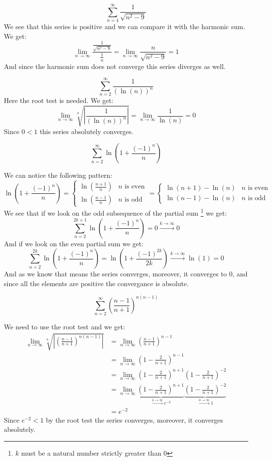 \documentclass[11pt,a4paper]{article}
\begin{document}
	\newpage
	
	\[
		\sum_{n=4}^{\infty}{\frac{1}{\sqrt{n^2-9}}}
	\]
	We see that this series is positive and we can compare it with the 
	harmonic sum. We get:
	\[
	\lim_{n\to\infty}{\frac{\frac{1}{\sqrt{n^2-9}}}{\frac{1}{n}}} = 
	\lim_{n\to\infty}{\frac{n}{\sqrt{n^2-9}}} = 1
	\]
	And since the harmonic sum does not converge this series diverges as well.
	
	\newpage
	
	\[
		\sum_{n=2}^{\infty}{\frac{1}{(\ln(n))^n}}
	\]
	Here the root test is needed. We get:
	\[
	\lim_{n\to\infty}{\sqrt[n]{\left\vert\frac{1}{(\ln(n))^n}\right\vert}} = 
	\lim_{n\to\infty}{\frac{1}{\ln(n)}} = 0
	\]
	Since $0 < 1$ this series absolutely converges.
	
	\newpage
	
	\[
		\sum_{n=2}^{\infty}{\ln\left(1+\frac{(-1)^n}{n}\right)}
	\]
	
	We can notice the following pattern:
	\[
	\ln\left(1+\frac{(-1)^n}{n}\right) = \begin{cases}
		 \ln\left(\frac{n+1}{n}\right) & \text{$n$ is even} \\
		 \ln\left(\frac{n-1}{n}\right) & \text{$n$ is odd}
	\end{cases} = \begin{cases}
		 \ln(n+1)-\ln(n) & \text{$n$ is even} \\
		 \ln(n-1)-\ln(n) & \text{$n$ is odd}
	\end{cases}
	\]
	We see that if we look on the odd subsequence of the partial sum
	\footnote{$k$ must be a natural number strictly greater than $0$}
	we get:
	\[
		\sum_{n=2}^{2k+1}{\ln\left(1+\frac{(-1)^n}{n}\right)} = 0 
		\xrightarrow{k\to\infty} 0
	\]
	And if we look on the even partial sum we get:
	\[
		\sum_{n=2}^{2k}{\ln\left(1+\frac{(-1)^n}{n}\right)} = 
		\ln\left(1+\frac{(-1)^{2k}}{2k}\right) \xrightarrow{k\to\infty} \ln(1)
		= 0
	\]
	And as we know that means the series converges, moreover, it converges
	to $0$, and since all the elements are positive the convergance is 
	absolute.
	
	\newpage
	
	\[
		\sum_{n=2}^{\infty}{\left(\frac{n-1}{n+1}\right)^{n(n-1)}}
	\]
	
	We need to use the root test and we get:
	\begin{align*}
	\lim_{n\to\infty}{\sqrt[n]{
	\left\vert\left(\frac{n-1}{n+1}\right)^{n(n-1)}\right\vert}} &= 
	\lim_{n\to\infty}{\left(\frac{n-1}{n+1}\right)^{n-1}} \\ &= 
	\lim_{n\to\infty}{\left(1 - \frac{2}{n+1}\right)^{n-1}} \\ &= 
	\lim_{n\to\infty}{\left(1 - \frac{2}{n+1}\right)^{n+1}\left(1 - \frac{2}
	{n+1}\right)^{-2}} \\ &=
	\lim_{n\to\infty}{\underbrace{\left(1 - \frac{2}{n+1}\right)^{n+1}
	}_{\xrightarrow{n\to\infty}e^{-2}}\underbrace{\left(1 - \frac{2}
	{n+1}\right)^{-2}}_{\xrightarrow{n\to\infty}1}} \\ &= e^{-2}
	\end{align*}
	Since $e^{-2} < 1$ by the root test the series converges, moreover, it 
	converges absolutely.
	
\end{document}
